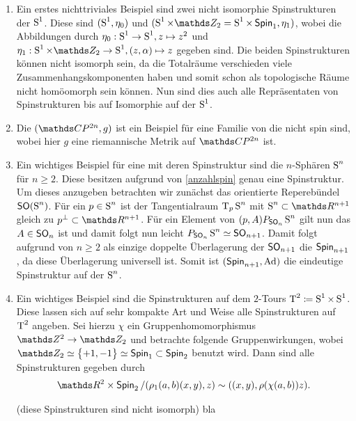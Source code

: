 \begin{Bsp}
\begin{enumerate}[(1)]
  \item Ein erstes nichttriviales Beispiel sind zwei nicht isomorphie
    Spinstrukturen der $\S^1$. Diese sind $(\S^1 , \eta_0)$ und
    $(\S^1 \times \Z_2 = \S^1 \times \spin_1 , \eta_1)$, wobei die
    Abbildungen durch $\eta_0 : \S^1 \rightarrow \S^1 , z \mapsto z^2$
    und
    $\eta_1 : \S^1 \times \Z_2 \rightarrow \S^1 , (z,\alpha) \mapsto
    z$
    gegeben sind. Die beiden Spinstrukturen können nicht isomorph
    sein, da die Totalräume verschieden viele Zusammenhangskomponenten
    haben und somit schon als topologische Räume nicht homöomorph sein
    können. Nun sind dies auch alle Repräsentaten von
    Spinstrukturen bis auf Isomorphie auf der $ \S^1 $.
  \item Die $(\CP^{2n},g)$ ist ein Beispiel für eine Familie von
    \RMFen die nicht spin sind, wobei hier $g$ eine riemannische
    Metrik auf $\CP^{2n}$ ist.  
    
  \item \label{SpinstrSphäre}Ein wichtiges Beispiel für eine \RMF mit deren Spinstruktur
    sind die $ n $-Sphären $\S^n$ für $ n \geq 2 $. Diese besitzen  
    aufgrund von \cref{anzahlspin} genau eine Spinstruktur. Um 
    dieses anzugeben betrachten wir zunächst das orientierte Reperebündel $ \so(\S^n) $. Für ein $ p\in\S^n $ ist der Tangentialraum $ \tang{p}{\S^n} $ mit $ \S^n\subset\R^{n+1} $ 
    gleich zu $ p^\bot\subset\R^{n+1} $. Für ein Element von $ (p,A) \Ph{\so_n}{\S^n} $ gilt nun das $ A \in\so_n$ ist und damit folgt
    nun leicht $ \Ph{\so_n}{\S^n} \simeq \so_{n+1} $. Damit folgt
    aufgrund von $ n\geq 2 $ als einzige doppelte Überlagerung der
    $ \so_{n+1} $ die $ \spin_{n+1} $, da diese Überlagerung universell ist. Somit ist $ (\spin_{n+1},\Ad) $ die eindeutige
    Spinstruktur auf der $ \S^n $.
  \item Ein wichtiges Beispiel sind die Spinstrukturen auf dem $ 2 $-Tours $ \T^2 \coloneqq \S^1\times\S^1$. Diese lassen sich auf sehr
  kompakte Art und Weise alle Spinstrukturen auf $ \T^2 $ angeben.
  Sei hierzu $ \chi $ ein Gruppenhomomorphismus $ \Z^2 \rightarrow \Z_2 $
  und betrachte folgende Gruppenwirkungen, wobei $ \Z_2\simeq\sset{+1,-1}\simeq\spin_1 \subset\spin_2 $ benutzt wird.
  Dann sind alle Spinstrukturen gegeben durch  
  \begin{gather*}
  	\R^2 \times \spin_2 / (\rho_1(a,b)(x,y),z) \sim ((x,y),\rho(\chi(a,b))z).
  \end{gather*}
  \begin{smallproof}(diese Spinstrukturen sind nicht isomorph)
  	bla
  \end{smallproof}
  
	\end{enumerate}
\end{Bsp}

